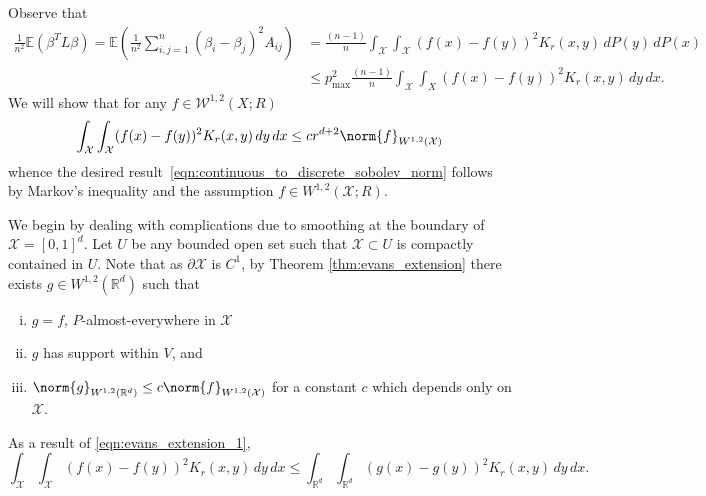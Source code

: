 \documentclass{article}
\newcommand{\Reals}{\mathbb{R}}
\newcommand{\1}{\mathbf{1}}
\newcommand{\Rd}{\Reals^d}
\newcommand{\X}{X} %
\newcommand{\Xset}{\mathcal{X}}
\newcommand{\Ebb}{\mathbb{E}}
\theoremstyle{alden}
\theoremstyle{aldenthm}
\theoremstyle{definition}
\theoremstyle{remark}
\begin{document}
Observe that
\begin{align*}
\frac{1}{n^2}\Ebb(\beta^T L \beta) = \Ebb\left(\frac{1}{n^2} \sum_{i,j = 1}^{n} (\beta_i - \beta_j)^2 A_{ij}\right) & = \frac{(n - 1)}{n} \int_{\Xset} \int_{\Xset} (f(x) - f(y))^2K_r(x,y) \,dP(y) \,dP(x) \\
& \leq p_{\max}^2 \frac{(n - 1)}{n} \int_{\Xset} \int_{\X} (f(x) - f(y))^2K_r(x,y) \,dy \,dx.
\end{align*}
We will show that for any $f \in \mathcal{W}^{1,2}(\X;R)$
\begin{equation}
\label{eqn:nonlocal_continuous_sobolev_norm}
\int_{\Xset} \int_{\Xset} (f(x) - f(y))^2K_r(x,y) \,dy \,dx \leq c r^{d + 2} \norm{f}_{W^{1,2}(\mathcal{X})}
\end{equation}
whence the desired result~\eqref{eqn:continuous_to_discrete_sobolev_norm} follows by Markov's inequality and the assumption $f \in W^{1,2}(\mathcal{X};R)$.

We begin by dealing with complications due to smoothing at the boundary of $\mathcal{X} = [0,1]^d$. Let $U$ be any bounded open set such that $\Xset \subset U$ is compactly contained in $U$. Note that as $\partial \Xset$ is $C^1$, by Theorem \ref{thm:evans_extension} there exists $g \in W^{1,2}(\Reals^d)$ such that
\begin{enumerate}[(i)]
	\item
	\label{eqn:evans_extension_1}
	$g = f$, $P$-almost-everywhere in $\Xset$
	\item 
	$g$ has support within $V$, and  
	\item 
	\label{eqn:sobolev_1_bound_2}
	$\norm{g}_{W^{1,2}(\Rd)} \leq c \norm{f}_{W^{1,2}(\Xset)}$ for a constant $c$ which depends only on $\Xset$.
\end{enumerate}
As a result of \ref{eqn:evans_extension_1},
\begin{equation}
\label{eqn:sobolev_1_bound_1}
\int_{\Xset} \int_{\Xset} (f(x) - f(y))^2K_r(x,y) \,dy \,dx \leq \int_{\Rd} \int_{\Rd} (g(x) - g(y))^2K_r(x,y) \,dy \,dx.
\end{equation}
\end{document}
